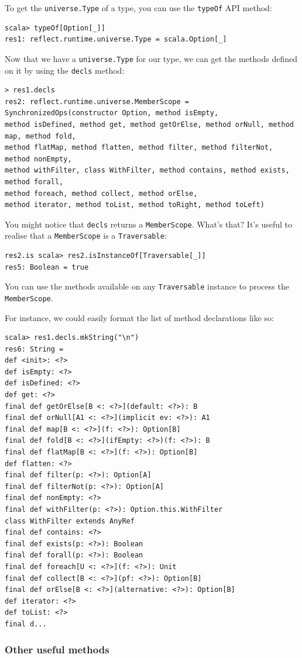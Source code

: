 \documentclass[11pt,a4paper,answers]{exam}
\begin{document}
To get the \verb!universe.Type! of a type, you can use the \verb!typeOf! API method:
\begin{Verbatim}
scala> typeOf[Option[_]]
res1: reflect.runtime.universe.Type = scala.Option[_]
\end{Verbatim}
Now that we have a \verb!universe.Type! for our type, we can get the methods defined on it by using the \verb!decls! method:
\begin{Verbatim}
> res1.decls
res2: reflect.runtime.universe.MemberScope = SynchronizedOps(constructor Option, method isEmpty, 
method isDefined, method get, method getOrElse, method orNull, method map, method fold, 
method flatMap, method flatten, method filter, method filterNot, method nonEmpty, 
method withFilter, class WithFilter, method contains, method exists, method forall, 
method foreach, method collect, method orElse, 
method iterator, method toList, method toRight, method toLeft)	
\end{Verbatim}
You might notice that \verb!decls! returns a \verb!MemberScope!. What’s that? 
It's useful to realise that a \verb!MemberScope! is a \verb!Traversable!:
\begin{Verbatim}
res2.is scala> res2.isInstanceOf[Traversable[_]]
res5: Boolean = true	
\end{Verbatim}
You can use the methods available on any \verb!Traversable! instance to process the \verb!MemberScope!.

For instance, we could easily format the list of method declarations like so:
\begin{Verbatim}
scala> res1.decls.mkString("\n")	
res6: String =
def <init>: <?>
def isEmpty: <?>
def isDefined: <?>
def get: <?>
final def getOrElse[B <: <?>](default: <?>): B
final def orNull[A1 <: <?>](implicit ev: <?>): A1
final def map[B <: <?>](f: <?>): Option[B]
final def fold[B <: <?>](ifEmpty: <?>)(f: <?>): B
final def flatMap[B <: <?>](f: <?>): Option[B]
def flatten: <?>
final def filter(p: <?>): Option[A]
final def filterNot(p: <?>): Option[A]
final def nonEmpty: <?>
final def withFilter(p: <?>): Option.this.WithFilter
class WithFilter extends AnyRef
final def contains: <?>
final def exists(p: <?>): Boolean
final def forall(p: <?>): Boolean
final def foreach[U <: <?>](f: <?>): Unit
final def collect[B <: <?>](pf: <?>): Option[B]
final def orElse[B <: <?>](alternative: <?>): Option[B]
def iterator: <?>
def toList: <?>
final d...
\end{Verbatim}

\subsubsection*{Other useful methods}
\end{document}
